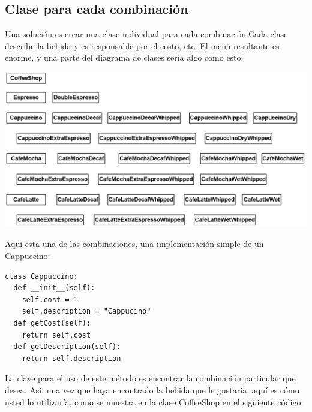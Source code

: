 \documentclass{article}
\begin{document}
\subsection{Clase para cada combinación}
Una solución es crear una clase individual  para cada combinación.Cada clase describe la bebida y es responsable por el costo, etc. El menú resultante es enorme, y una parte del diagrama de clases sería algo como esto:    \newline

\includegraphics[width=\textwidth]{PaginaNo74} 

Aqui esta una de las combinaciones, una implementación simple de un Cappuccino:     \newline

\begin{lstlisting} 
class Cappuccino: 
  def __init__(self): 
    self.cost = 1 
    self.description = "Cappucino" 
  def getCost(self): 
    return self.cost 
  def getDescription(self): 
    return self.description 
\end{lstlisting}

La clave para el uso de este método es encontrar la combinación particular que desea. Así, una vez que haya encontrado la bebida que le gustaría, aquí es cómo usted lo utilizaría, como se muestra en la clase CoffeeShop en el siguiente código:     \newline
\end{document}
